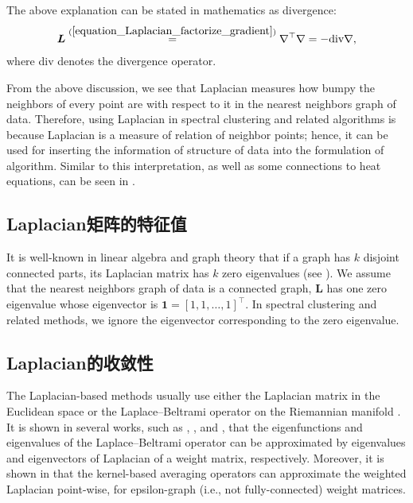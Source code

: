 \documentclass[lang=cn,10pt]{gorgeousnbook}
\numberwithin{equation}{section}%
\numberwithin{figure}{section}%
\begin{document}
The above explanation can be stated in mathematics as divergence:
\begin{align}
\boldsymbol{L} \overset{(\ref{equation_Laplacian_factorize_gradient})}{=} \nabla^\top \nabla = -\text{div} \nabla,
\end{align}
where div denotes the divergence operator. 

From the above discussion, we see that Laplacian measures how bumpy the neighbors of every point are with respect to it in the nearest neighbors graph of data. Therefore, using Laplacian in spectral clustering and related algorithms is because Laplacian is a measure of relation of neighbor points; hence, it can be used for inserting the information of structure of data into the formulation of algorithm. Similar to this interpretation, as well as some connections to heat equations, can be seen in \cite{belkin2005towards}.

\subsection{Laplacian矩阵的特征值}\label{section_eig_Laplacian}

It is well-known in linear algebra and graph theory that if a graph has $k$ disjoint connected parts, its Laplacian matrix has $k$ zero eigenvalues (see \cite{polito2002grouping,ahmadizadeh2017eigenvalues}).
We assume that the nearest neighbors graph of data is a connected graph, $\boldsymbol{L}$ has one zero eigenvalue whose eigenvector is $\boldsymbol{1} = [1, 1, \dots, 1]^\top$. In spectral clustering and related methods, we ignore the eigenvector corresponding to the zero eigenvalue. 

\subsection{Laplacian的收敛性}

The Laplacian-based methods usually use either the Laplacian matrix in the Euclidean space or the Laplace--Beltrami operator on the Riemannian manifold \cite{hein2005graphs}. 
It is shown in several works, such as \cite{burago2015graph}, \cite{trillos2020error}, and \cite{dunson2021spectral}, that the eigenfunctions and eigenvalues of the Laplace--Beltrami operator can be approximated by eigenvalues and eigenvectors of Laplacian of a weight matrix, respectively. 
Moreover, it is shown in \cite{hein2005graphs,hein2007graph} that the kernel-based averaging operators can approximate the weighted Laplacian point-wise, for epsilon-graph (i.e., not fully-connected) weight matrices. 
\end{document}
